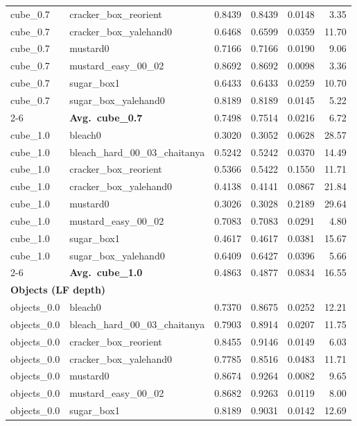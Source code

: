 \begin{longtable}{llrrrr}
  cube_0.7 & cracker\_box\_reorient & 0.8439 & 0.8439 & 0.0148 & 3.35 \\
  cube_0.7 & cracker\_box\_yalehand0 & 0.6468 & 0.6599 & 0.0359 & 11.70 \\
  cube_0.7 & mustard0 & 0.7166 & 0.7166 & 0.0190 & 9.06 \\
  cube_0.7 & mustard\_easy\_00\_02 & 0.8692 & 0.8692 & 0.0098 & 3.36 \\
  cube_0.7 & sugar\_box1 & 0.6433 & 0.6433 & 0.0259 & 10.70 \\
  cube_0.7 & sugar\_box\_yalehand0 & 0.8189 & 0.8189 & 0.0145 & 5.22 \\
  \cmidrule{2-6}
  & \textbf{Avg.~cube_0.7} & 0.7498 & 0.7514 & 0.0216 & 6.72 \\
  \midrule
  cube_1.0 & bleach0 & 0.3020 & 0.3052 & 0.0628 & 28.57 \\
  cube_1.0 & bleach\_hard\_00\_03\_chaitanya & 0.5242 & 0.5242 & 0.0370 & 14.49 \\
  cube_1.0 & cracker\_box\_reorient & 0.5366 & 0.5422 & 0.1550 & 11.71 \\
  cube_1.0 & cracker\_box\_yalehand0 & 0.4138 & 0.4141 & 0.0867 & 21.84 \\
  cube_1.0 & mustard0 & 0.3026 & 0.3028 & 0.2189 & 29.64 \\
  cube_1.0 & mustard\_easy\_00\_02 & 0.7083 & 0.7083 & 0.0291 & 4.80 \\
  cube_1.0 & sugar\_box1 & 0.4617 & 0.4617 & 0.0381 & 15.67 \\
  cube_1.0 & sugar\_box\_yalehand0 & 0.6409 & 0.6427 & 0.0396 & 5.66 \\
  \cmidrule{2-6}
  & \textbf{Avg.~cube_1.0} & 0.4863 & 0.4877 & 0.0834 & 16.55 \\
  \midrule
\multicolumn{6}{l}{\textbf{Objects (LF depth)}} \\
\midrule
  objects_0.0 & bleach0 & 0.7370 & 0.8675 & 0.0252 & 12.21 \\
  objects_0.0 & bleach\_hard\_00\_03\_chaitanya & 0.7903 & 0.8914 & 0.0207 & 11.75 \\
  objects_0.0 & cracker\_box\_reorient & 0.8455 & 0.9146 & 0.0149 & 6.03 \\
  objects_0.0 & cracker\_box\_yalehand0 & 0.7785 & 0.8516 & 0.0483 & 11.71 \\
  objects_0.0 & mustard0 & 0.8674 & 0.9264 & 0.0082 & 9.65 \\
  objects_0.0 & mustard\_easy\_00\_02 & 0.8682 & 0.9263 & 0.0119 & 8.00 \\
  objects_0.0 & sugar\_box1 & 0.8189 & 0.9031 & 0.0142 & 12.69 \\

\end{longtable}
